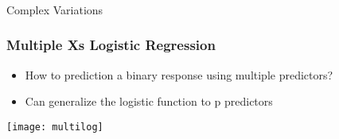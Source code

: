 





\begin{frame}[fragile]\frametitle{}
\begin{center}
{\Large Complex Variations}
\end{center}
\end{frame}



\begin{frame}[fragile]\frametitle{Multiple Xs Logistic Regression}
\begin{itemize}
\item How to prediction a binary response using multiple predictors?
\item Can generalize the logistic function to p predictors
\end{itemize}
\begin{center}
\texttt{[image: multilog]}
\end{center}
\end{frame}

